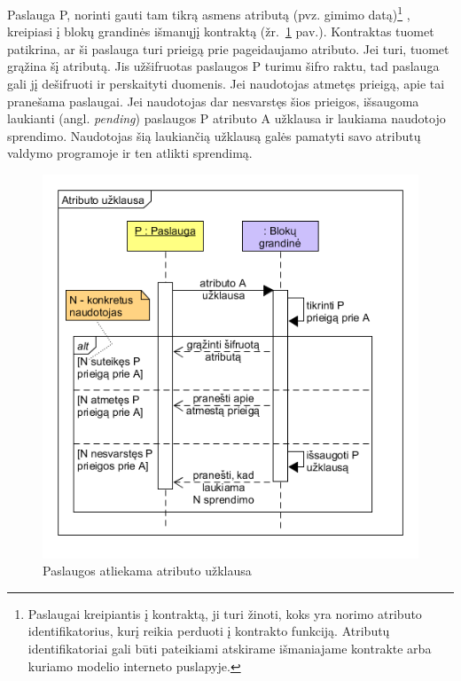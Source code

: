 Paslauga P, norinti gauti tam tikrą asmens atributą (pvz. gimimo datą)\footnote{ Paslaugai kreipiantis į kontraktą, ji turi žinoti, koks yra norimo atributo identifikatorius, kurį reikia perduoti į kontrakto funkciją. 
Atributų identifikatoriai gali būti pateikiami atskirame išmaniajame kontrakte arba kuriamo modelio interneto puslapyje.}
, kreipiasi į blokų grandinės išmanųjį kontraktą (žr.\hypertarget{fig:askForAttributeSequence}{~\ref{fig:askForAttributeSequence} pav.}).
Kontraktas tuomet patikrina, ar ši paslauga turi prieigą prie pageidaujamo atributo. Jei turi, tuomet grąžina šį atributą. Jis
užšifruotas paslaugos P turimu šifro raktu, tad paslauga gali jį dešifruoti ir perskaityti duomenis. Jei
naudotojas atmetęs prieigą, apie tai pranešama paslaugai. Jei naudotojas dar nesvarstęs šios prieigos, išsaugoma laukianti
(angl. \textit{pending}) paslaugos P atributo A užklausa ir laukiama naudotojo sprendimo. Naudotojas šią laukiančią užklausą galės pamatyti savo 
atributų valdymo programoje ir ten atlikti sprendimą.

\begin{figure}[h]
    \centering
    \includegraphics[scale=0.7]{img/askForAttributeSequence}
    \caption{Paslaugos atliekama atributo užklausa}
    \label{fig:askForAttributeSequence}
\end{figure}

